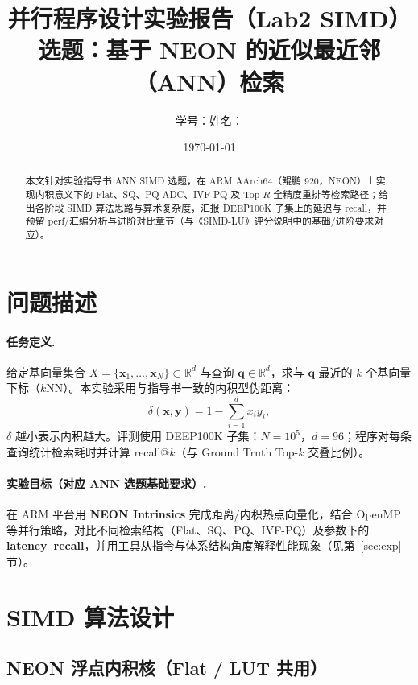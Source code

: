 \documentclass[UTF8,a4paper,11pt]{ctexart}
\title{并行程序设计实验报告（Lab2 SIMD）\\选题：基于 NEON 的近似最近邻（ANN）检索}
\author{学号：\underline{\hspace{3cm}}\quad 姓名：\underline{\hspace{3cm}}}
\date{\today}
\begin{document}
\maketitle

\begin{abstract}
  本文针对实验指导书 ANN SIMD 选题，在 ARM AArch64（鲲鹏 920，NEON）上实现内积意义下的 Flat、SQ、PQ-ADC、IVF-PQ 及 Top-$R$ 全精度重排等检索路径；给出各阶段 SIMD 算法思路与算术复杂度，汇报 DEEP100K 子集上的延迟与 recall，并预留 perf/汇编分析与进阶对比章节（与《SIMD-LU》评分说明中的基础/进阶要求对应）。
\end{abstract}

\section{问题描述}
\label{sec:problem}

\paragraph{任务定义.}
给定基向量集合 $X=\{\mathbf{x}_1,\ldots,\mathbf{x}_N\}\subset\mathbb{R}^d$ 与查询 $\mathbf{q}\in\mathbb{R}^d$，求与 $\mathbf{q}$ 最近的 $k$ 个基向量下标（$k$NN）。本实验采用与指导书一致的内积型伪距离：
\begin{equation}
  \delta(\mathbf{x},\mathbf{y}) = 1 - \sum_{i=1}^{d} x_i y_i ,
\end{equation}
$\delta$ 越小表示内积越大。评测使用 DEEP100K 子集：$N=10^5$，$d=96$；程序对每条查询统计检索耗时并计算 recall@$k$（与 Ground Truth Top-$k$ 交叠比例）。

\paragraph{实验目标（对应 ANN 选题基础要求）.}
在 ARM 平台用 \textbf{NEON Intrinsics} 完成距离/内积热点向量化，结合 OpenMP 等并行策略，对比不同检索结构（Flat、SQ、PQ、IVF-PQ）及参数下的 \textbf{latency--recall}，并用工具从指令与体系结构角度解释性能现象（见第~\ref{sec:exp} 节）。

\section{SIMD 算法设计}
\label{sec:design}

\subsection{NEON 浮点内积核（Flat / LUT 共用）}
\end{document}
